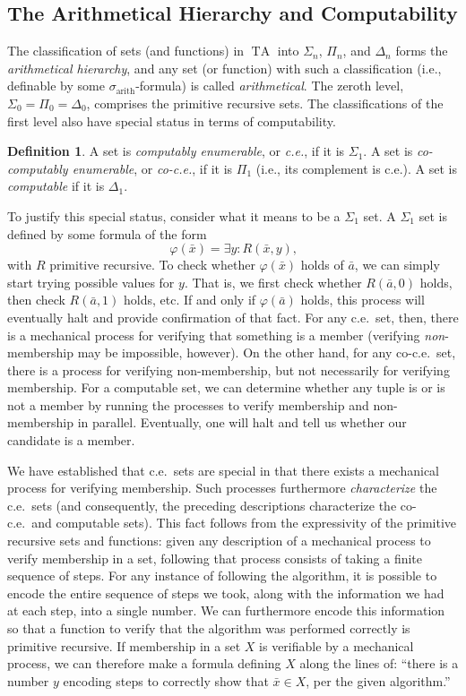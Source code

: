 \documentclass{article}
\theoremstyle{plain}
\theoremstyle{definition}
\newtheorem{defn}[thm]{Definition}
\newcommand{\defterm}{\emph}
\newcommand{\arithsig}{\sigma_{\operatorname{arith}}}
\newcommand{\tuple}{\bar}
\DeclareMathOperator{\TA}{TA}
\renewcommand{\phi}{\varphi}
\begin{document}
\subsection{The Arithmetical Hierarchy and Computability}

The classification of sets (and functions) in $\TA$ into $\Sigma_n$,
$\Pi_n$, and $\Delta_n$ forms the \defterm{arithmetical hierarchy},
and any set (or function) with such a classification (i.e., definable
by some $\arithsig$-formula) is called \defterm{arithmetical}. The
zeroth level, $\Sigma_0 = \Pi_0 = \Delta_0$, comprises the primitive
recursive sets. The classifications of the first level also have
special status in terms of computability.

\begin{defn}
  A set is \defterm{computably enumerable}, or \defterm{c.e.}, if it
  is $\Sigma_1$. A set is \defterm{co-computably enumerable}, or
  \defterm{co-c.e.}, if it is $\Pi_1$ (i.e., its complement is
  c.e.). A set is \defterm{computable} if it is $\Delta_1$.
\end{defn}

To justify this special status, consider what it means to be a
$\Sigma_1$ set. A $\Sigma_1$ set is defined by some formula of the
form $$\phi(\tuple{x}) = \exists y : R(\tuple{x},y)\text{,}$$ with $R$
primitive recursive. To check whether $\phi(\tuple{x})$ holds of
$\tuple{a}$, we can simply start trying possible values for $y$. That
is, we first check whether $R(\tuple{a},0)$ holds, then check
$R(\tuple{a},1)$ holds, etc. If and only if $\phi(\tuple{a})$ holds,
this process will eventually halt and provide confirmation of that
fact. For any c.e.\ set, then, there is a mechanical process for
verifying that something is a member (verifying \emph{non}-membership
may be impossible, however). On the other hand, for any co-c.e.\ set,
there is a process for verifying non-membership, but not necessarily
for verifying membership. For a computable set, we can determine
whether any tuple is or is not a member by running the processes to
verify membership and non-membership in parallel. Eventually, one will
halt and tell us whether our candidate is a member.

We have established that c.e.\ sets are special in that there exists a
mechanical process for verifying membership. Such processes
furthermore \emph{characterize} the c.e.\ sets (and consequently, the
preceding descriptions characterize the co-c.e.\ and computable
sets). This fact follows from the expressivity of the primitive
recursive sets and functions: given any description of a mechanical
process to verify membership in a set, following that process consists
of taking a finite sequence of steps. For any instance of following
the algorithm, it is possible to encode the entire sequence of steps
we took, along with the information we had at each step, into a single
number. We can furthermore encode this information so that a function
to verify that the algorithm was performed correctly is primitive
recursive. If membership in a set $X$ is verifiable by a mechanical
process, we can therefore make a formula defining $X$ along the lines
of: ``there is a number $y$ encoding steps to correctly show that
$\tuple{x} \in X$, per the given algorithm.''
\end{document}
